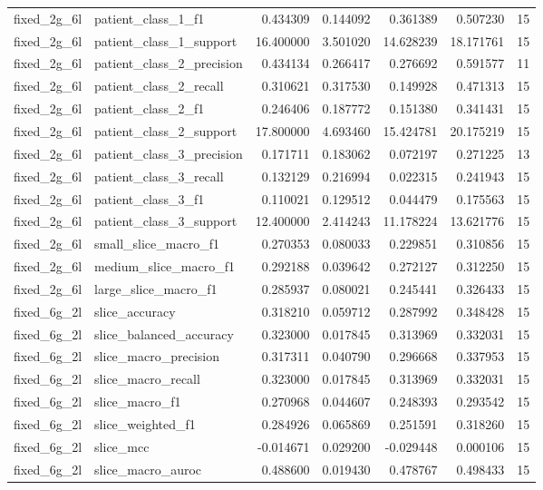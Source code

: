 \begin{tabular}{llrrrrr}
fixed_2g_6l & patient_class_1_f1 & 0.434309 & 0.144092 & 0.361389 & 0.507230 & 15 \\
fixed_2g_6l & patient_class_1_support & 16.400000 & 3.501020 & 14.628239 & 18.171761 & 15 \\
fixed_2g_6l & patient_class_2_precision & 0.434134 & 0.266417 & 0.276692 & 0.591577 & 11 \\
fixed_2g_6l & patient_class_2_recall & 0.310621 & 0.317530 & 0.149928 & 0.471313 & 15 \\
fixed_2g_6l & patient_class_2_f1 & 0.246406 & 0.187772 & 0.151380 & 0.341431 & 15 \\
fixed_2g_6l & patient_class_2_support & 17.800000 & 4.693460 & 15.424781 & 20.175219 & 15 \\
fixed_2g_6l & patient_class_3_precision & 0.171711 & 0.183062 & 0.072197 & 0.271225 & 13 \\
fixed_2g_6l & patient_class_3_recall & 0.132129 & 0.216994 & 0.022315 & 0.241943 & 15 \\
fixed_2g_6l & patient_class_3_f1 & 0.110021 & 0.129512 & 0.044479 & 0.175563 & 15 \\
fixed_2g_6l & patient_class_3_support & 12.400000 & 2.414243 & 11.178224 & 13.621776 & 15 \\
fixed_2g_6l & small_slice_macro_f1 & 0.270353 & 0.080033 & 0.229851 & 0.310856 & 15 \\
fixed_2g_6l & medium_slice_macro_f1 & 0.292188 & 0.039642 & 0.272127 & 0.312250 & 15 \\
fixed_2g_6l & large_slice_macro_f1 & 0.285937 & 0.080021 & 0.245441 & 0.326433 & 15 \\
fixed_6g_2l & slice_accuracy & 0.318210 & 0.059712 & 0.287992 & 0.348428 & 15 \\
fixed_6g_2l & slice_balanced_accuracy & 0.323000 & 0.017845 & 0.313969 & 0.332031 & 15 \\
fixed_6g_2l & slice_macro_precision & 0.317311 & 0.040790 & 0.296668 & 0.337953 & 15 \\
fixed_6g_2l & slice_macro_recall & 0.323000 & 0.017845 & 0.313969 & 0.332031 & 15 \\
fixed_6g_2l & slice_macro_f1 & 0.270968 & 0.044607 & 0.248393 & 0.293542 & 15 \\
fixed_6g_2l & slice_weighted_f1 & 0.284926 & 0.065869 & 0.251591 & 0.318260 & 15 \\
fixed_6g_2l & slice_mcc & -0.014671 & 0.029200 & -0.029448 & 0.000106 & 15 \\
fixed_6g_2l & slice_macro_auroc & 0.488600 & 0.019430 & 0.478767 & 0.498433 & 15 \\

\end{tabular}
